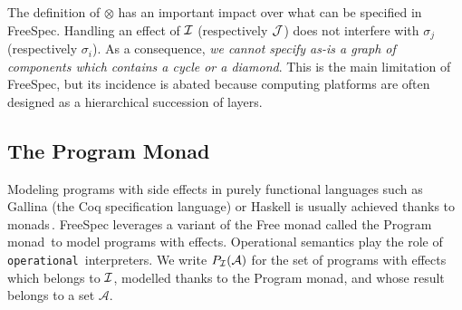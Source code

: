 The definition of $\otimes$ has an important impact over what can be specified
in FreeSpec.
%
%
Handling an effect of $\mathcal{I}$ (respectively $\mathcal{J}$) does not interfere 
with $\sigma_j$ (respectively $\sigma_i$).
%
As a consequence, \emph{we cannot specify as-is a graph of components which
  contains a cycle or a diamond}. 
%
This is the main limitation of FreeSpec, but its incidence is abated because
computing platforms are often designed as a hierarchical succession of layers.

\subsection{The Program Monad}

Modeling programs with side effects in purely functional languages such as
{\textsc Gallina} (the Coq specification language) or Haskell is usually
achieved thanks to monads\,\cite{hoareetal2001monad}.
%
FreeSpec leverages a variant of the Free monad called the Program
monad\,\cite{operational} to model programs with effects. Operational semantics
play the role of \texttt{operational}\,\cite{operational} interpreters.
%
We write $P_{\mathcal{I}}(\mathcal{A})$ for the set of programs with effects which
belongs to $\mathcal{I}$, modelled thanks to the Program monad, and whose result belongs
to a set $\mathcal{A}$.


